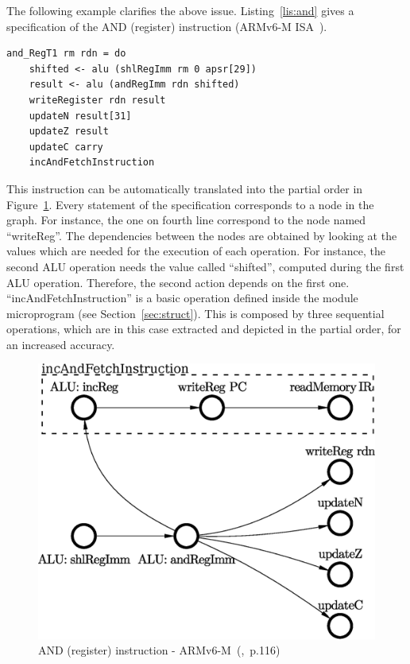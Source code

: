 \documentclass[conference]{IEEEtran}
\begin{document}
The following example clarifies the above issue. 
Listing~\ref{lis:and} gives a specification of the AND (register) instruction (ARMv6-M ISA~\cite{armManual}).\\

\begin{lstlisting}[caption=AND (register) instruction - Farfalle specification,
frame=single, label=lis:and]
and_RegT1 rm rdn = do
    shifted <- alu (shlRegImm rm 0 apsr[29])
    result <- alu (andRegImm rdn shifted)
    writeRegister rdn result
    updateN result[31]
    updateZ result
    updateC carry
    incAndFetchInstruction
\end{lstlisting}

\noindent
This instruction can be automatically translated into the partial order in
Figure~\ref{fig:andPO}. Every statement of the specification corresponds to a node in the
graph. For instance, the one on fourth line correspond to the node named ``writeReg''.
The dependencies between the nodes are obtained by looking at the values which are needed for
the execution of each operation. For instance, the second ALU operation needs the value
called ``shifted'', computed during the first ALU operation. Therefore, the second action
depends on the first one.
``incAndFetchInstruction'' is a basic operation defined inside the module microprogram (see
Section~\ref{sec:struct}). This is composed by three sequential operations, which are in this
case extracted and depicted in the partial order, for an increased accuracy.

\begin{figure}[ht!]
\begin{center}
	\includegraphics[width=\linewidth]{IMG/and_RegT1.eps}
	\caption{AND (register) instruction - ARMv6-M~(\cite{armManual},~p.116)}
	\label{fig:andPO}
\end{center}
\end{figure}
\end{document}
